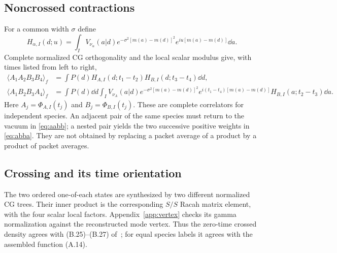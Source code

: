 \subsection{Noncrossed contractions}
For a common width $\sigma$ define
\begin{equation}
 H_{\alpha,I}(d;u)=\int_I V_{\nu_\alpha}(a|d)
 e^{-\sigma^2[m(a)-m(d)]^2}e^{iu[m(a)-m(d)]}\dd a.
\end{equation}
Complete normalized CG orthogonality and the local scalar modulus give,
with times listed from left to right,
\begin{align}
 \langle A_1A_2B_3B_4\rangle_f
 &=\int P(d)H_{A,I}(d;t_1-t_2)
                    H_{B,I}(d;t_3-t_4)\dd d,\label{eq:aabb}\\
 \langle A_1B_2B_3A_4\rangle_f
 &=\int P(d)\dd d\int_I V_{\nu_A}(a|d)
 e^{-\sigma^2[m(a)-m(d)]^2}
 e^{i(t_1-t_4)[m(a)-m(d)]}
 H_{B,I}(a;t_2-t_3)\dd a.
 \label{eq:abba}
\end{align}
Here $A_j=\Phi_{A,I}(t_j)$ and $B_j=\Phi_{B,I}(t_j)$.
These are complete correlators for independent species. An adjacent pair
of the same species must return to the vacuum in \eqref{eq:aabb};
a nested pair yields the two successive positive weights in
\eqref{eq:abba}. They are not obtained by replacing a packet average of a
product by a product of packet averages.

\subsection{Crossing and its time orientation}
The two ordered one-of-each states are synthesized by two different
normalized CG trees. Their inner product is the corresponding $S/S$
Racah matrix element, with the four scalar local factors.
Appendix~\ref{app:vertex} checks its gamma normalization against the
reconstructed mode vertex. Thus the zero-time crossed density agrees with
(B.25)--(B.27) of~\cite{KL}; for equal species labels it agrees with the
assembled function (A.14).


